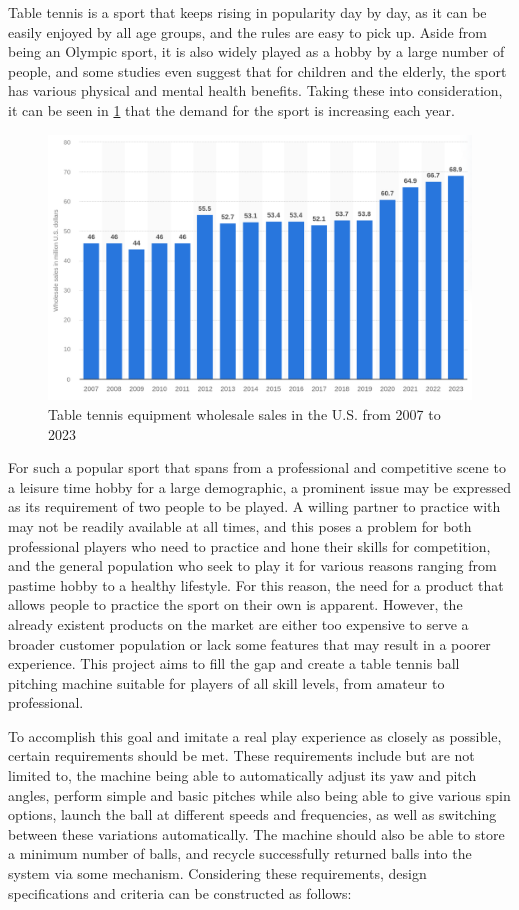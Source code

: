 \documentclass[12pt]{report}
\begin{document}
Table tennis is a sport that keeps rising in popularity day by day, as it can be easily enjoyed by all age groups, and the rules are easy to pick up. Aside from being an Olympic sport, it is also
widely played as a hobby by a large number of people, and some studies even suggest that for
children and the elderly, the sport has various physical and mental health benefits. Taking these
into consideration, it can be seen in \ref{fig:intro} that the demand for the sport is increasing each year.
\begin{figure}[h!]
    \centering
    \includegraphics[width=0.7\linewidth]{figures/wholesales.png}
    \caption{Table tennis equipment wholesale sales in the U.S. from 2007 to 2023 \cite{statista2024}}
    \label{fig:intro}
\end{figure}

For such a popular sport that spans from a professional and competitive scene to a leisure time hobby for a large demographic, a prominent issue may be expressed as its requirement of two people to be played. A willing partner to practice with may not be readily available at all times, and this poses a problem for both professional players who need to practice and hone their skills for competition, and the general population who seek to play it for various reasons ranging from pastime hobby to a healthy lifestyle. For this reason, the need for a product that allows people to practice the sport on their own is apparent. However, the already existent products on the market are either too expensive to serve a broader customer population or lack some features that may result in a poorer experience. This project aims to fill the gap and create a table tennis ball pitching machine suitable for players of all skill levels, from amateur to professional.

To accomplish this goal and imitate a real play experience as closely as possible, certain requirements should be met. These requirements include but are not limited to, the machine being able to automatically adjust its yaw and pitch angles, perform simple and basic pitches while also being able to give various spin options, launch the ball at different speeds and frequencies, as well as switching between these variations automatically. The machine should also be able to store a minimum number of balls, and recycle successfully returned balls into the system via some mechanism. Considering these requirements, design specifications and criteria can be constructed as follows:
\end{document}
